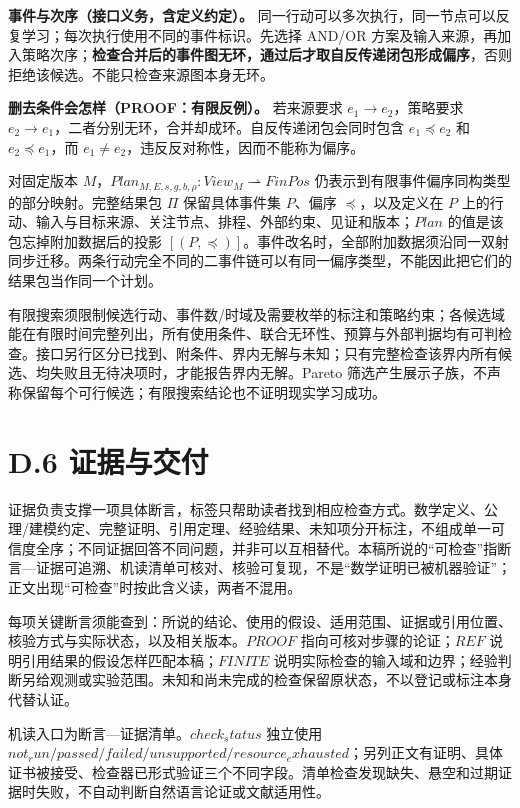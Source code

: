 \documentclass[UTF8,a4paper,zihao=-4,fontset=windows,openany]{ctexbook}
\def\mathrm#1{#1}%
\begin{document}
\textbf{事件与次序（接口义务，含定义约定）。} 同一行动可以多次执行，同一节点可以反复学习；每次执行使用不同的事件标识。先选择 AND/OR 方案及输入来源，再加入策略次序；\textbf{检查合并后的事件图无环，通过后才取自反传递闭包形成偏序}，否则拒绝该候选。不能只检查来源图本身无环。

\textbf{删去条件会怎样（PROOF：有限反例）。} 若来源要求 \(e_{1}\to e_{2}\)，策略要求 \(e_{2}\to e_{1}\)，二者分别无环，合并却成环。自反传递闭包会同时包含 \(e_{1}\preceq e_{2}\) 和 \(e_{2}\preceq e_{1}\)，而 \(e_{1}\ne e_{2}\)，违反反对称性，因而不能称为偏序。

对固定版本 \(M\)，\(\mathrm{Plan}_{M,E,s,g,b,\rho}:\mathrm{View}_M \rightharpoonup \mathrm{FinPos}\) 仍表示到有限事件偏序同构类型的部分映射。完整结果包 \(\Pi\) 保留具体事件集 \(P\)、偏序 \(\preceq\)，以及定义在 \(P\) 上的行动、输入与目标来源、关注节点、排程、外部约束、见证和版本；\(\mathrm{Plan}\) 的值是该包忘掉附加数据后的投影 \([(P,\preceq)]\)。事件改名时，全部附加数据须沿同一双射同步迁移。两条行动完全不同的二事件链可以有同一偏序类型，不能因此把它们的结果包当作同一个计划。

有限搜索须限制候选行动、事件数/时域及需要枚举的标注和策略约束；各候选域能在有限时间完整列出，所有使用条件、联合无环性、预算与外部判据均有可判检查。接口另行区分已找到、附条件、界内无解与未知；只有完整检查该界内所有候选、均失败且无待决项时，才能报告界内无解。Pareto 筛选产生展示子族，不声称保留每个可行候选；有限搜索结论也不证明现实学习成功。

\section{D.6 证据与交付}
证据负责支撑一项具体断言，标签只帮助读者找到相应检查方式。数学定义、公理/建模约定、完整证明、引用定理、经验结果、未知项分开标注，不组成单一可信度全序；不同证据回答不同问题，并非可以互相替代。本稿所说的“可检查”指断言—证据可追溯、机读清单可核对、核验可复现，不是“数学证明已被机器验证”；正文出现“可检查”时按此含义读，两者不混用。

每项关键断言须能查到：所说的结论、使用的假设、适用范围、证据或引用位置、核验方式与实际状态，以及相关版本。\(\mathrm{PROOF}\) 指向可核对步骤的论证；\(\mathrm{REF}\) 说明引用结果的假设怎样匹配本稿；\(\mathrm{FINITE}\) 说明实际检查的输入域和边界；经验判断另给观测或实验范围。未知和尚未完成的检查保留原状态，不以登记或标注本身代替认证。

机读入口为断言—证据清单。\(\mathrm{check}_\mathrm{status}\) 独立使用 \(\mathrm{not}_\mathrm{run} / \mathrm{passed} / \mathrm{failed} / \mathrm{unsupported} / \mathrm{resource}_\mathrm{exhausted}\)；另列正文有证明、具体证书被接受、检查器已形式验证三个不同字段。清单检查发现缺失、悬空和过期证据时失败，不自动判断自然语言论证或文献适用性。
\end{document}

